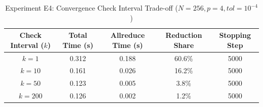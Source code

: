 \begin{table}[htbp]
\centering
\small
\caption{Experiment E4: Convergence Check Interval Trade-off ($N=256, p=4, tol=10^{-4}$)}
\label{tab:ksweep}
\begin{tabular}{ccccc}
\hline
\textbf{Check Interval ($k$)} & \textbf{Total Time (s)} & \textbf{Allreduce Time (s)} & \textbf{Reduction Share} & \textbf{Stopping Step} \\
\hline
$k=1$ & 0.312 & 0.188 & 60.6\% & 5000 \\
$k=10$ & 0.161 & 0.026 & 16.2\% & 5000 \\
$k=50$ & 0.123 & 0.005 & 3.8\% & 5000 \\
$k=200$ & 0.126 & 0.002 & 1.2\% & 5000 \\
\hline
\end{tabular}
\end{table}
